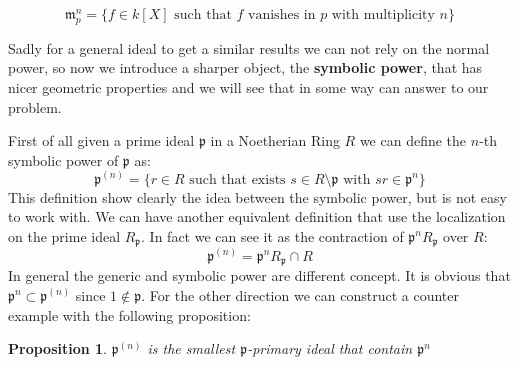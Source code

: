 \documentclass[notitlepage, a4]{book}
\theoremstyle{plain}
\newtheorem{prop}[teo]{Proposition}
\theoremstyle{remark}
\theoremstyle{definition}
\newcommand{\p}{\mathfrak{p}}
\newcommand{\mm}{\mathfrak{m}}
\newcounter{que}
\begin{document}
	\begin{equation}\label{eq:max_pow}
		\mm_p^n = \{ f \in k[X] \text{ such that } f \text{ vanishes in } p \text{ with multiplicity } n\}
	\end{equation}
	
	Sadly for a general ideal to get a similar results we can not rely on the normal power, so now we introduce a sharper object, the \textbf{symbolic power}, that has nicer geometric properties and we will see that in some way can answer to our problem. %
	
%	
%		
	First of all given a prime ideal $ \p $ in a Noetherian Ring $ R $ we can define the $ n $-th symbolic power of $ \p $ as:
	\begin{equation}\label{eq:sym_pow_p1}
		\p^{(n)} = \{ r \in R \text{ such that exists } s \in R \setminus \p \text{ with } sr \in \p^n \}
	\end{equation}
	This definition show clearly the idea between the symbolic power, but is not easy to work with. We can have another equivalent definition that use the localization on the prime ideal $ R_\p $. In fact we can see it as the contraction of $ \p^n R_\p $ over $ R $:
	\begin{equation}\label{eq:sym_pow_p2}
		\p^{(n)} = \p^n R_\p \cap R
	\end{equation}
	In general the generic and symbolic power are different concept. It is obvious that $ \p^{n} \subset \p^{(n)} $ since $ 1 \not \in \p $. For the other direction we can construct a counter example with the following proposition:
	\begin{prop}\label{prop:sym_is_primary}
		$ \p^{(n)} $ is the smallest $ \p $-primary ideal that contain $ \p^n $
	\end{prop}
\end{document}
